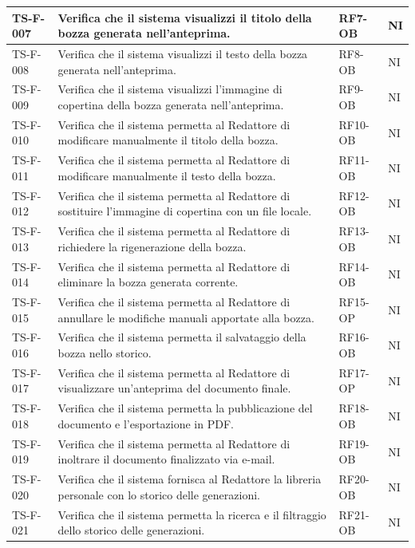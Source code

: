 \documentclass[a4paper,12pt]{article}
\begin{document}
\begin{longtable}{|p{2.2cm}|p{9.5cm}|p{2.3cm}|p{1.5cm}|}
    \hline
    TS-F-007 & Verifica che il sistema visualizzi il titolo della bozza generata nell'anteprima. & RF7-OB & NI \\
    \hline
    TS-F-008 & Verifica che il sistema visualizzi il testo della bozza generata nell'anteprima. & RF8-OB & NI \\
    \hline
    TS-F-009 & Verifica che il sistema visualizzi l'immagine di copertina della bozza generata nell'anteprima. & RF9-OB & NI \\
    \hline
    TS-F-010 & Verifica che il sistema permetta al Redattore di modificare manualmente il titolo della bozza. & RF10-OB & NI \\
    \hline
    TS-F-011 & Verifica che il sistema permetta al Redattore di modificare manualmente il testo della bozza. & RF11-OB & NI \\
    \hline
    TS-F-012 & Verifica che il sistema permetta al Redattore di sostituire l'immagine di copertina con un file locale. & RF12-OB & NI \\
    \hline
    TS-F-013 & Verifica che il sistema permetta al Redattore di richiedere la rigenerazione della bozza. & RF13-OB & NI \\
    \hline
    TS-F-014 & Verifica che il sistema permetta al Redattore di eliminare la bozza generata corrente. & RF14-OB & NI \\
    \hline
    TS-F-015 & Verifica che il sistema permetta al Redattore di annullare le modifiche manuali apportate alla bozza. & RF15-OP & NI \\
    \hline
    TS-F-016 & Verifica che il sistema permetta il salvataggio della bozza nello storico. & RF16-OB & NI \\
    \hline
    TS-F-017 & Verifica che il sistema permetta al Redattore di visualizzare un'anteprima del documento finale. & RF17-OP & NI \\
    \hline
    TS-F-018 & Verifica che il sistema permetta la pubblicazione del documento e l'esportazione in PDF. & RF18-OB & NI \\
    \hline
    TS-F-019 & Verifica che il sistema permetta al Redattore di inoltrare il documento finalizzato via e-mail. & RF19-OB & NI \\
    \hline
    TS-F-020 & Verifica che il sistema fornisca al Redattore la libreria personale con lo storico delle generazioni. & RF20-OB & NI \\
    \hline
    TS-F-021 & Verifica che il sistema permetta la ricerca e il filtraggio dello storico delle generazioni. & RF21-OB & NI \\

\end{longtable}
\end{document}
